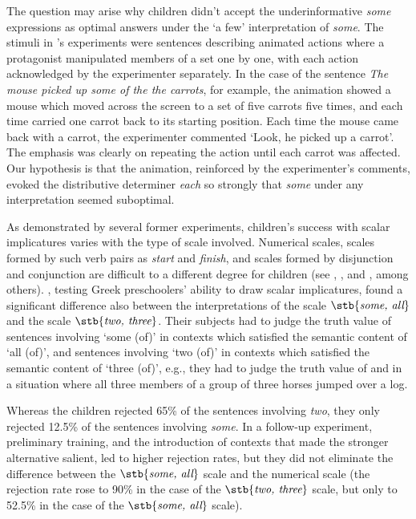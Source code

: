 \documentclass[output=paper]{langscibook}
\begin{document}
The question may arise why children didn't accept the underinformative \textit{some} expressions as optimal answers under the ‘a few’ interpretation of \textit{some}. The stimuli in \citeauthor{katsos2011pragmatic}'s experiments were sentences describing animated actions where a protagonist manipulated members of a set one by one, with each action acknowledged by the experimenter separately. In the case of the sentence \textit{The mouse picked up some of the the carrots}, for example, the animation showed a mouse which moved across the screen to a set of five carrots five times, and each time carried one carrot back to its starting position. Each time the mouse came back with a carrot, the experimenter commented `Look, he picked up a carrot'. The emphasis was clearly on repeating the action until each carrot was affected. Our hypothesis is that the animation, reinforced by the experimenter's comments, evoked the distributive determiner \textit{each} so strongly that \textit{some} under any interpretation seemed suboptimal.

As demonstrated by several former experiments, children's success with scalar implicatures varies with the type of scale involved. Numerical scales, scales \linebreak formed by such verb pairs as \textit{start} and \textit{finish}, and scales formed by disjunction and conjunction are difficult to a different degree for children (see \citealt{noveck2001children}, \citealt{papafragou2003scalar}, and \citealt{barner2011accessing}, among others). \citet{papafragou2003scalar}, testing Greek preschoolers' ability to draw scalar implicatures, found a significant difference also between the interpretations of the scale $\stb{\textit{some, all}}$ and the scale $\stb{\textit{two, three}}$. Their subjects had to judge the truth value of sentences involving `some (of)' in contexts which satisfied the semantic content of `all (of)', and sentences involving `two (of)' in contexts which satisfied the semantic content of `three (of)', e.g., they had to judge the truth value of  and  in a situation where all three members of a group of three horses jumped over a log. 

\eal
{}
\zl

\noindent Whereas the children rejected 65\% of the sentences involving \textit{two}, they only rejected 12.5\% of the sentences involving \textit{some}. In a follow-up experiment, preliminary training, and the introduction of contexts that made the stronger alternative salient, led to higher rejection rates, but they did not eliminate the difference between the $\stb{\textit{some, all}}$ scale and the numerical scale (the rejection rate rose to 90\% in the case of the $\stb{\textit{two, three}}$ scale, but only to 52.5\% in the case of the $\stb{\textit{some, all}}$ scale). 
\end{document}

